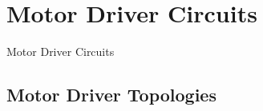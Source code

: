 \documentclass{beamer}
\begin{document}
\begin{frame}
\titlepage

\setcounter{tocdepth}{1}
\tableofcontents
\end{frame}


\section{Motor Driver Circuits} %
\begin{frame}
\centering \huge Motor Driver Circuits
\end{frame}

\subsection{Motor Driver Topologies}
\end{document}
